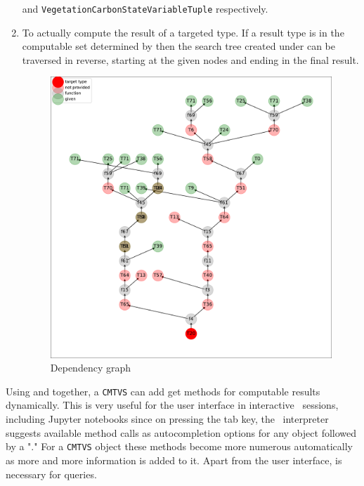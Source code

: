 \begin{enumerate}
{  } and 
  \texttt{VegetationCarbonStateVariableTuple} 
  respectively. 
  \item
  \label{enum:compute}
  To actually  compute the result of a targeted type.
  If a result type is in the computable set determined by  then 
  the search tree created under  can be traversed in reverse, starting
  at the given nodes and ending in the final result.
\begin{figure}[h]
  \includegraphics[width=\textwidth]{dep_graph.pdf}
  \caption{Dependency graph}
  {
    \small
    
  }  
  \label{fig:dep_graph}
\end{figure}  
\end{enumerate} 
Using  and  together, a
\texttt{CMTVS} can add get methods for computable results dynamically.  This
is very useful for the user interface in interactive \python\ sessions,
including Jupyter notebooks since on pressing the tab key, the \python\
interpreter suggests available method calls as autocompletion options for any
object followed by a "." For a \texttt{CMTVS} object these methods become
more numerous automatically as more and more information is added to it.
Apart from the user interface, \enumref{enum:computable} is necessary for queries.
